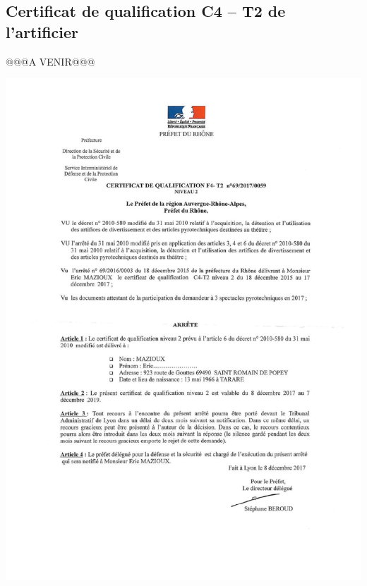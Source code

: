 \documentclass[hidelinks, paper=a4, fontsize=13pt]{report}
\begin{document}
\subsection{Certificat de qualification C4 – T2 de l’artificier}
@@@A VENIR@@@
\begin{center}
\includegraphics[scale=0.70]{Annexes/Documents/CertificatArtifice2}
\end{center}
\end{document}
